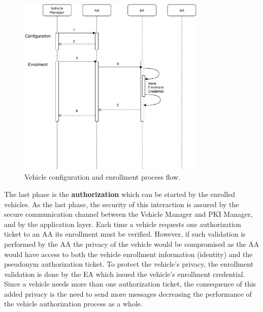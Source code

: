 \begin{figure}[!htb]
	\centering
	\includegraphics[width=0.8\textwidth]{Figures/protocolo_1}
	\caption{\label{fig:protocol_1}Vehicle configuration and enrollment process flow.}
\end{figure}

The last phase is the \textbf{authorization} which can be started by the enrolled vehicles. As the last phase, the security of this interaction is assured by the secure communication channel between the Vehicle Manager and PKI Manager, and by the application layer. Each time a vehicle requests one authorization ticket to an AA its enrollment must be verified. However, if such validation is performed by the AA the privacy of the vehicle would be compromised as the AA would have access to both the vehicle enrollment information (identity) and the pseudonym authorization ticket. To protect the vehicle's privacy, the enrollment validation is done by the EA which issued the vehicle's enrollment credential. Since a vehicle needs more than one authorization ticket, the consequence of this added privacy is the need to send more messages decreasing the performance of the vehicle authorization process as a whole. 

